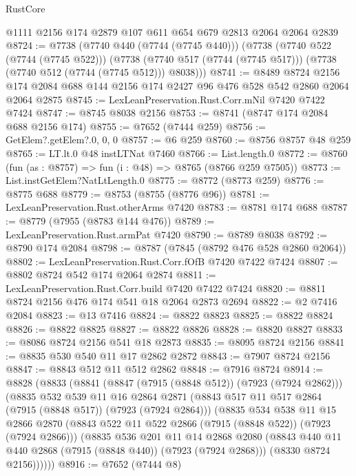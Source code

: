 \begin{lexlean}{RustCore}
\begin{coremodule}
    @1111
    @2156
    @174
    @2879
    @107
    @611
    @654
    @679
    @2813
    @2064
    @2064
    @2839
@8724 := @7738
    (@7740 @440 (@7744 (@7745 @440)))
    (@7738
      (@7740 @522 (@7744 (@7745 @522)))
      (@7738 (@7740 @517 (@7744 (@7745 @517))) (@7738 (@7740 @512 (@7744 (@7745 @512))) @8038)))
@8741 := @8489
    @8724
    @2156
    @174
    @2084
    @688
    @144
    @2156
    @174
    @2427
    @96
    @476
    @528
    @542
    @2860
    @2064
    @2064
    @2875
@8745 := LexLeanPreservation.Rust.Corr.mNil @7420 @7422 @7424
@8747 := @8745 @8038 @2156
@8753 := @8741 (@8747 @174 @2084 @688 @2156 @174)
@8755 := @7652 (@7444 @259)
@8756 := GetElem?.getElem?.{0, 0, 0}
@8757 := @6 @259
@8760 := @8756 @8757 @48 @259
@8765 := LT.lt.{0} @48 instLTNat @7460
@8766 := List.length.{0}
@8772 := @8760 (fun (as : @8757) => fun (i : @48) => @8765 (@8766 @259 @7505))
@8773 := List.instGetElem?NatLtLength.{0}
@8775 := @8772 (@8773 @259)
@8776 := @8775 @688
@8779 := @8753 (@8755 (@8776 @96))
@8781 := LexLeanPreservation.Rust.otherArms @7420
@8783 := @8781 @174 @688
@8787 := @8779 (@7955 (@8783 @144 @476))
@8789 := LexLeanPreservation.Rust.armPat @7420
@8790 := @8789 @8038
@8792 := @8790 @174 @2084
@8798 := @8787 (@7845 (@8792 @476 @528 @2860 @2064))
@8802 := LexLeanPreservation.Rust.Corr.fOfB @7420 @7422 @7424
@8807 := @8802 @8724 @542 @174 @2064 @2874
@8811 := LexLeanPreservation.Rust.Corr.build @7420 @7422 @7424
@8820 := @8811 @8724 @2156 @476 @174 @541 @18 @2064 @2873 @2694
@8822 := @2 @7416 @2084
@8823 := @13 @7416
@8824 := @8822 @8823
@8825 := @8822 @8824
@8826 := @8822 @8825
@8827 := @8822 @8826
@8828 := @8820 @8827
@8833 := @8086 @8724 @2156 @541 @18 @2873
@8835 := @8095 @8724 @2156
@8841 := @8835 @530 @540 @11 @17 @2862 @2872
@8843 := @7907 @8724 @2156
@8847 := @8843 @512 @11 @512 @2862
@8848 := @7916 @8724
@8914 := @8828
    (@8833
      (@8841
        (@8847 (@7915 (@8848 @512)) (@7923 (@7924 @2862)))
        (@8835
          @532
          @539
          @11
          @16
          @2864
          @2871
          (@8843 @517 @11 @517 @2864 (@7915 (@8848 @517)) (@7923 (@7924 @2864)))
          (@8835
            @534
            @538
            @11
            @15
            @2866
            @2870
            (@8843 @522 @11 @522 @2866 (@7915 (@8848 @522)) (@7923 (@7924 @2866)))
            (@8835
              @536
              @201
              @11
              @14
              @2868
              @2080
              (@8843 @440 @11 @440 @2868 (@7915 (@8848 @440)) (@7923 (@7924 @2868)))
              (@8330 @8724 @2156))))))
@8916 := @7652 (@7444 @8)

\end{coremodule}
\end{lexlean}
